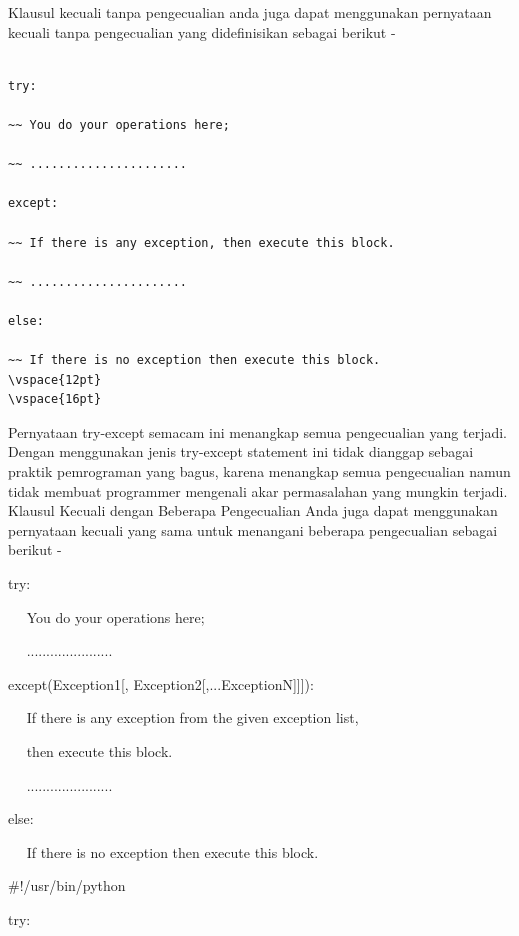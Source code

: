 Klausul kecuali tanpa pengecualian anda juga dapat menggunakan pernyataan kecuali tanpa pengecualian yang didefinisikan sebagai berikut - 
\vspace{12pt}

\begin{verbatim}

try: 

~~ You do your operations here; 

~~ ...................... 

except:

~~ If there is any exception, then execute this block. 

~~ ...................... 

else: 

~~ If there is no exception then execute this block.  
\vspace{12pt}
\vspace{16pt}

\end{verbatim}

 \hspace*{0.5in} Pernyataan try-except semacam ini menangkap semua pengecualian yang terjadi. Dengan menggunakan jenis try-except statement ini tidak dianggap sebagai praktik pemrograman yang bagus, karena menangkap semua pengecualian namun tidak membuat programmer mengenali akar permasalahan yang mungkin terjadi. Klausul Kecuali dengan Beberapa Pengecualian Anda juga dapat menggunakan pernyataan kecuali yang sama untuk menangani beberapa pengecualian sebagai berikut - 
\vspace{12pt}
 
try: 

~~ You do your operations here; 

~~ ...................... 

except(Exception1[, Exception2[,...ExceptionN]]]): 

~~ If there is any exception from the given exception list,  

~~ then execute this block. 

~~ ...................... 

else: 

~~ If there is no exception then execute this block.  
\vspace{12pt}
\vspace{12pt}
 
 $  \#  $!/usr/bin/python 
\vspace{12pt}

try: 

